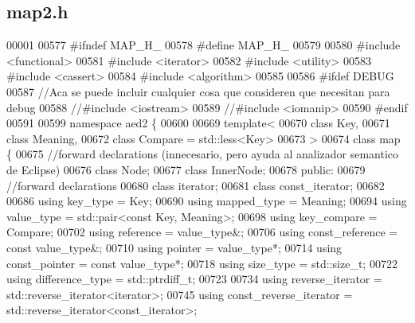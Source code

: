 \hypertarget{map2_8h_source}{\subsection{map2.\-h}
}

\begin{DoxyCode}
00001 
00577 \textcolor{preprocessor}{#ifndef MAP\_H\_}
00578 \textcolor{preprocessor}{}\textcolor{preprocessor}{#define MAP\_H\_}
00579 \textcolor{preprocessor}{}
00580 \textcolor{preprocessor}{#include <functional>}
00581 \textcolor{preprocessor}{#include <iterator>}
00582 \textcolor{preprocessor}{#include <utility>}
00583 \textcolor{preprocessor}{#include <cassert>}
00584 \textcolor{preprocessor}{#include <algorithm>}
00585 
00586 \textcolor{preprocessor}{#ifdef DEBUG}
00587 \textcolor{preprocessor}{}\textcolor{comment}{//Aca se puede incluir cualquier cosa que consideren que necesitan para debug}
00588 \textcolor{comment}{//#include <iostream>}
00589 \textcolor{comment}{//#include <iomanip>}
00590 \textcolor{preprocessor}{#endif}
00591 \textcolor{preprocessor}{}
00599 \textcolor{keyword}{namespace }aed2 \{
00600 
00669 \textcolor{keyword}{template}<
00670   \textcolor{keyword}{class }Key,
00671   \textcolor{keyword}{class }Meaning,
00672   \textcolor{keyword}{class }Compare = std::less<Key>
00673 >
00674 \textcolor{keyword}{class }map \{
00675     \textcolor{comment}{//forward declarations (innecesario, pero ayuda al analizador semantico de
       Eclipse)}
00676     \textcolor{keyword}{class }Node;
00677     \textcolor{keyword}{class }InnerNode;
00678 \textcolor{keyword}{public}:
00679     \textcolor{comment}{//forward declarations}
00680     \textcolor{keyword}{class }iterator;
00681     \textcolor{keyword}{class }const\_iterator;
00682 
00686     \textcolor{keyword}{using} key\_type = Key;
00690     \textcolor{keyword}{using} mapped\_type = Meaning;
00694     \textcolor{keyword}{using} value\_type = std::pair<const Key, Meaning>;
00698     \textcolor{keyword}{using} key\_compare = Compare;
00702     \textcolor{keyword}{using} reference = value\_type&;
00706     \textcolor{keyword}{using} const\_reference = \textcolor{keyword}{const} value\_type&;
00710     \textcolor{keyword}{using} pointer = value\_type*;
00714     \textcolor{keyword}{using} const\_pointer = \textcolor{keyword}{const} value\_type*;
00718     \textcolor{keyword}{using} size\_type = std::size\_t;
00722     \textcolor{keyword}{using} difference\_type = std::ptrdiff\_t;
00723 
00734     \textcolor{keyword}{using} reverse\_iterator = std::reverse\_iterator<iterator>;
00745     \textcolor{keyword}{using} const\_reverse\_iterator = std::reverse\_iterator<const\_iterator>;

\end{DoxyCode}

